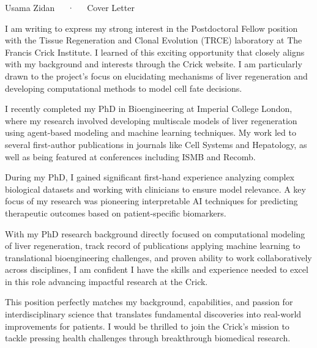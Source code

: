 \documentclass[11pt, a4paper]{awesome-cv}
\begin{document}
\makecvheader[R]

\makecvfooter
  {}
  {Usama Zidan~~~·~~~Cover Letter}
  {}

\makelettertitle

\begin{cvletter}


I am writing to express my strong interest in the Postdoctoral Fellow position with the Tissue Regeneration and Clonal Evolution (TRCE) laboratory at The Francis Crick Institute. I learned of this exciting opportunity that closely aligns with my background and interests through the Crick website. I am particularly drawn to the project's focus on elucidating mechanisms of liver regeneration and developing computational methods to model cell fate decisions.


I recently completed my PhD in Bioengineering at Imperial College London, where my research involved developing multiscale models of liver regeneration using agent-based modeling and machine learning techniques. My work led to several first-author publications in journals like Cell Systems and Hepatology, as well as being featured at conferences including ISMB and Recomb.

During my PhD, I gained significant first-hand experience analyzing complex biological datasets and working with clinicians to ensure model relevance. A key focus of my research was pioneering interpretable AI techniques for predicting therapeutic outcomes based on patient-specific biomarkers.


With my PhD research background directly focused on computational modeling of liver regeneration, track record of publications applying machine learning to translational bioengineering challenges, and proven ability to work collaboratively across disciplines, I am confident I have the skills and experience needed to excel in this role advancing impactful research at the Crick. 

This position perfectly matches my background, capabilities, and passion for interdisciplinary science that translates fundamental discoveries into real-world improvements for patients. I would be thrilled to join the Crick's mission to tackle pressing health challenges through breakthrough biomedical research.




\end{cvletter}






\makeletterclosing
\end{document}
